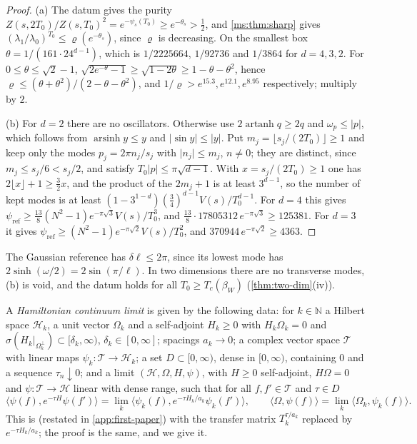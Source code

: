 \documentclass[11pt,a4paper]{amsart}
\theoremstyle{definition}
\theoremstyle{remark}
\numberwithin{equation}{section}
\newcommand{\Nat}{\mathbb{N}}        %
\newcommand{\Hilb}{\mathcal{H}}      %
\newcommand{\ip}[2]{\langle #1,#2\rangle}  %
\newcommand{\abs}[1]{\lvert #1\rvert}      %
\newcommand{\psiT}[2]{\psi_{#1}(#2)}       %
\newcommand{\Vol}[1]{V(#1)}                %
\newcommand{\lzero}{\lambda_0}             %
\newcommand{\betaW}{\beta_{W}}             %
\begin{document}
\begin{proof}
(a) The datum gives the purity $Z(s,2T_0)/Z(s,T_0)^2=e^{-\psiT{s}{T_0}}\ge e^{-\theta_s}>\frac12$, and \cref{ms:thm:sharp} gives $(\lambda_1/\lzero)^{T_0}\le\varrho(e^{-\theta_s})$, since $\varrho$ is decreasing. On the smallest box $\theta=1/(161\cdot24^{d-1})$, which is $1/2225664$, $1/92736$ and $1/3864$ for $d=4,3,2$. For $0\le\theta\le\sqrt2-1$, $\sqrt{2e^{-\theta}-1}\ge\sqrt{1-2\theta}\ge1-\theta-\theta^2$, hence $\varrho\le(\theta+\theta^2)/(2-\theta-\theta^2)$, and $1/\varrho>e^{15.3},e^{12.1},e^{8.95}$ respectively; multiply by $2$.

(b) For $d=2$ there are no oscillators. Otherwise use $2\operatorname{artanh}q\ge2q$ and $\omega_p\le\abs p$, which follows from $\operatorname{arsinh}y\le y$ and $\abs{\sin y}\le\abs y$. Put $m_j=\lfloor s_j/(2T_0)\rfloor\ge1$ and keep only the modes $p_j=2\pi n_j/s_j$ with $\abs{n_j}\le m_j$, $n\ne0$; they are distinct, since $m_j\le s_j/6<s_j/2$, and satisfy $T_0\abs p\le\pi\sqrt{d-1}$. With $x=s_j/(2T_0)\ge1$ one has $2\lfloor x\rfloor+1\ge\frac32x$, and the product of the $2m_j+1$ is at least $3^{d-1}$, so the number of kept modes is at least $(1-3^{1-d})(\frac34)^{d-1}\Vol s/T_0^{d-1}$. For $d=4$ this gives $\psi_{\mathrm{ref}}\ge\frac{13}8(N^2-1)e^{-\pi\sqrt3}\Vol s/T_0^3$, and $\frac{13}8\cdot17805312\,e^{-\pi\sqrt3}\ge125381$. For $d=3$ it gives $\psi_{\mathrm{ref}}\ge(N^2-1)e^{-\pi\sqrt2}\Vol s/T_0^2$, and $370944\,e^{-\pi\sqrt2}\ge4363$.
\end{proof}

The Gaussian reference has $\delta\ell\le2\pi$, since its lowest mode has $2\sinh(\omega/2)=2\sin(\pi/\ell)$. In two dimensions there are no transverse modes, (b) is void, and the datum holds for all $T_0\ge T_c(\betaW)$ (\cref{thm:two-dim}(iv)).

A \emph{Hamiltonian continuum limit} is given by the following data: for $k\in\Nat$ a Hilbert space $\Hilb_k$, a unit vector $\Omega_k$ and a self-adjoint $H_k\ge0$ with $H_k\Omega_k=0$ and $\sigma(H_k|_{\Omega_k^\perp})\subset[\delta_k,\infty)$, $\delta_k\in[0,\infty]$; spacings $a_k\to0$; a complex vector space $\mathcal T$ with linear maps $\psi_k\colon\mathcal T\to\Hilb_k$; a set $D\subset[0,\infty)$, dense in $[0,\infty)$, containing $0$ and a sequence $\tau_n\downarrow0$; and a limit $(\Hilb,\Omega,H,\psi)$, with $H\ge0$ self-adjoint, $H\Omega=0$ and $\psi\colon\mathcal T\to\Hilb$ linear with dense range, such that for all $f,f'\in\mathcal T$ and $\tau\in D$
\[
\ip{\psi(f)}{e^{-\tau H}\psi(f')}=\lim_k\ip{\psi_k(f)}{e^{-\tau H_k/a_k}\psi_k(f')},\qquad\ip\Omega{\psi(f)}=\lim_k\ip{\Omega_k}{\psi_k(f)}.
\]
This is \cite[Lemma~A32]{bhattacharjee2026first} (restated in \cref{app:first-paper}) with the transfer matrix $T_k^{\tau/a_k}$ replaced by $e^{-\tau H_k/a_k}$; the proof is the same, and we give it.
\end{document}
